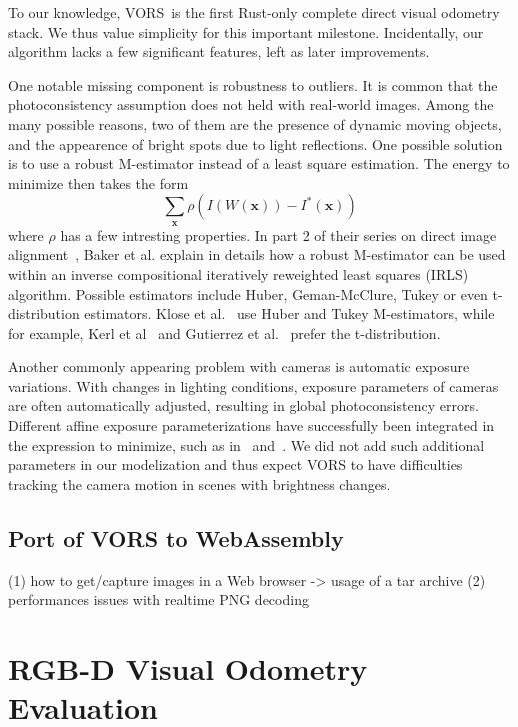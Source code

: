 To our knowledge,
VORS is the first Rust-only complete direct visual odometry stack.
We thus value simplicity for this important milestone.
Incidentally, our algorithm lacks a few significant features,
left as later improvements.

One notable missing component is robustness to outliers.
It is common that the photoconsistency assumption does not held with real-world images.
Among the many possible reasons, two of them are the presence of dynamic moving objects,
and the appearence of bright spots due to light reflections.
One possible solution is to use a robust M-estimator instead of a least square estimation.
The energy to minimize then takes the form
\[
	\sum_{\bm{x}}\rho(I(W(\bm{x})) - I^{*}(\bm{x}))
\]
where $\rho$ has a few intresting properties.
In part 2 of their series on direct image alignment~\cite{baker2003lucas},
Baker et al. explain in details how a robust M-estimator can be used
within an inverse compositional iteratively reweighted least squares (IRLS) algorithm.
Possible estimators include Huber, Geman-McClure, Tukey or even t-distribution estimators.
Klose et al.~\cite{klose2013efficient} use Huber and Tukey M-estimators,
while for example, Kerl et al~\cite{kerl2013robust}
and Gutierrez et al.~\cite{gutierrez2015inverse} prefer the t-distribution.

Another commonly appearing problem with cameras is automatic exposure variations.
With changes in lighting conditions,
exposure parameters of cameras are often automatically adjusted,
resulting in global photoconsistency errors.
Different affine exposure parameterizations have successfully been integrated
in the expression to minimize, such as in~\cite{klose2013efficient} and~\cite{engel2017direct}.
We did not add such additional parameters in our modelization
and thus expect VORS to have difficulties tracking the camera motion
in scenes with brightness changes.


\subsection{Port of VORS to WebAssembly}%
\label{sub:vors-port-wasm}

(1) how to get/capture images in a Web browser -> usage of a tar archive
(2) performances issues with realtime PNG decoding


\section{RGB-D Visual Odometry Evaluation}%
\label{sec:rgbd-vo-evaluation}

